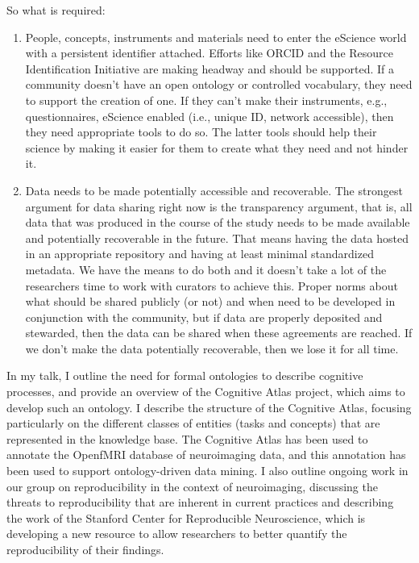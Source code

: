\documentclass[a4paper,UKenglish]{dagrep}
\begin{document}
So what is required:

\begin{enumerate}
\item People, concepts, instruments and materials need to enter the eScience
world with a persistent identifier attached.  Efforts like ORCID and the
Resource Identification Initiative are making headway and should be supported. 
If a community doesn't have an open ontology or controlled vocabulary, they need
to support the creation of one.  If they can't make their instruments, e.g.,
questionnaires, eScience enabled (i.e., unique ID, network accessible), then
they need appropriate tools to do so.  The latter tools should help their
science by making it easier for them to create what they need and not hinder it.
\item Data needs to be made potentially accessible and recoverable.  The
strongest argument for data sharing right now is the transparency argument, that
is, all data that was produced in the course of the study needs to be made
available and potentially recoverable in the future.  That means having the data
hosted in an appropriate repository and having at least minimal standardized
metadata.  We have the means to do both and it doesn't take a lot of the
researchers time to work with curators to achieve this.  Proper norms about what
should be shared publicly (or not) and when need to be developed in conjunction
with the community, but if data are properly deposited and stewarded, then the
data can be shared when these agreements are reached.  If we don't make the data
potentially recoverable, then we lose it for all time.
\end{enumerate}


{}
\license
In my talk, I outline the need for formal ontologies to describe cognitive 
processes, and provide an overview of the Cognitive Atlas project, which aims to 
develop such an ontology.  I describe the structure of the Cognitive Atlas, 
focusing particularly on the different classes of entities (tasks and concepts)
that 
are represented in the knowledge base.  The Cognitive Atlas has been used to 
annotate the OpenfMRI database of neuroimaging data, and this annotation has 
been used to support ontology-driven data mining.  I also outline ongoing work in 
our group on reproducibility in the context of neuroimaging, discussing the 
threats to reproducibility that are inherent in current practices and describing
the 
work of the Stanford Center for Reproducible Neuroscience, which is developing a 
new resource to allow researchers to better quantify the reproducibility of their 
findings.
 
\end{document}

